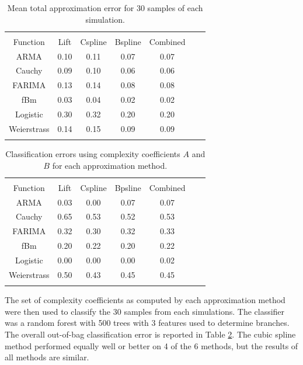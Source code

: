 \begin{table}[!htbp] \centering 
\begin{tabular}{@{\extracolsep{1pt}} ccccccc} 
\\[-1.8ex]\hline 
\hline \\[-1.8ex] 
  Function & Lift & Cspline & Bspline & Combined \\ \hline 
ARMA       & 0.10  & 0.11    & 0.07 & 0.07 \\ 
Cauchy       & 0.09  & 0.10  & 0.06 & 0.06 \\ 
FARIMA       & 0.13  & 0.14  & 0.08 & 0.08 \\ 
fBm          & 0.03  & 0.04  & 0.02 & 0.02 \\ 
Logistic     & 0.30  & 0.32  & 0.20 & 0.20 \\ 
Weierstrass  & 0.14  & 0.15  & 0.09 & 0.09 \\ 
\hline \\[-1.8ex] 
          \end{tabular} 
  \caption{Mean total approximation error for 30 samples of each simulation. 
             }
  \label{tab:epsilons-all}
\end{table}


\begin{table}[!htbp] \centering 
\begin{tabular}{@{\extracolsep{1pt}} ccccccc} 
\\[-1.8ex]\hline 
\hline \\[-1.8ex] 
Function    &  Lift & Cspline & Bpsline  & Combined 
                                       \\ \hline
ARMA        & 0.03 &   0.00 &   0.07 &   0.07  \\ 
Cauchy      & 0.65 &   0.53 &   0.52  &    0.53  \\ 
FARIMA      & 0.32 &   0.30 &   0.32  &    0.33 \\ 
fBm         & 0.20  &   0.22  & 0.20 &  0.22  \\ 
Logistic    & 0.00 &   0.00 &   0.00  &    0.02  \\ 
Weierstrass & 0.50 &   0.43 &   0.45  &    0.45  \\
\hline \\[-1.8ex] 
          \end{tabular} 
  \caption{Classification errors using complexity coefficients  
  $A$ and $B$ for each approximation method.}
  \label{tab:error-all}
\end{table}

The set of complexity coefficients as computed by each 
approximation method were then used to classify the 30 samples from each simulations. The classifier was a random forest with 
500 trees with 3 features used to determine branches. The overall out-of-bag classification error is reported in Table \ref{tab:error-all}. The cubic 
spline method performed equally well or better
on 4 of the 6 methods, but the results of all methods are 
similar.

